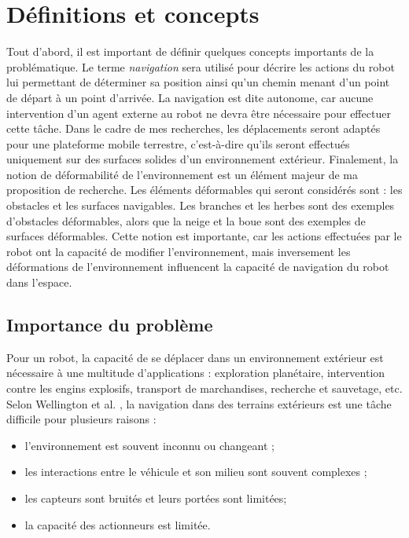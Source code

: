 \documentclass[12pt, letterpaper]{article} %
\begin{document}
\section{Définitions et concepts}
Tout d'abord, il est important de définir quelques concepts importants de la problématique. Le terme \emph{navigation} sera utilisé pour décrire les actions du robot lui permettant de déterminer sa position ainsi qu'un chemin menant d'un point de départ à un point d'arrivée. La navigation est dite autonome, car aucune intervention d'un agent externe au robot ne devra être nécessaire pour effectuer cette tâche. Dans le cadre de mes recherches, les déplacements seront adaptés pour une plateforme mobile terrestre, c'est-à-dire qu'ils seront effectués uniquement sur des surfaces solides d'un environnement extérieur. Finalement, la notion de déformabilité de l'environnement est un élément majeur de ma proposition de recherche. Les éléments déformables qui seront considérés sont : les obstacles et les surfaces navigables. Les branches et les herbes sont des exemples d'obstacles déformables, alors que la neige et la boue sont des exemples de surfaces déformables. Cette notion est importante, car les actions effectuées par le robot ont la capacité de modifier l'environnement, mais inversement les déformations de l'environnement influencent la capacité de navigation du robot dans l'espace.

\subsection{Importance du problème}
\label{s:problematique}
Pour un robot, la capacité de se déplacer dans un environnement extérieur est nécessaire à une multitude d'applications : exploration planétaire, intervention contre les engins explosifs, transport de marchandises, recherche et sauvetage, etc. Selon Wellington et al. \cite{Wellington2004}, la navigation dans des terrains extérieurs est une tâche difficile pour plusieurs raisons : 
\begin{itemize}
    \item l'environnement est souvent inconnu ou changeant ;
    \item les interactions entre le véhicule et son milieu sont souvent complexes ;
    \item les capteurs sont bruités et leurs portées sont limitées;
    \item la capacité des actionneurs est limitée.
\end{itemize} 
\end{document}
